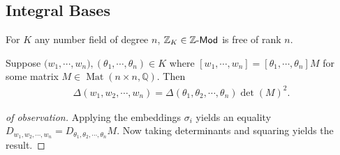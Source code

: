 \hypertarget{integral-bases}{%
\subsection{Integral Bases}\label{integral-bases}}

\begin{theorem}

For \(K\) any number field of degree \(n\),
\({\mathbb{Z}}_K \in {\mathsf{{\mathbb{Z}}}{\hbox{-}}\mathsf{Mod}}\) is
free of rank \(n\).

\end{theorem}

\begin{observation}

Suppose
\(\mathbf{(}w_1, \cdots, w_n), (\theta_1, \cdots, \theta_n) \in K\)
where
\({\left[ {w_1, \cdots, w_n} \right]} = {\left[ { \theta_1, \cdots, \theta_n } \right]} M\)
for some matrix \(M\in \operatorname{Mat}(n\times n, {\mathbb{Q}})\).
Then
\begin{align*}
\Delta({ {w}_1, {w}_2, \cdots, {w}_{n}}) = \Delta({ {\theta}_1, {\theta}_2, \cdots, {\theta}_{n}}) \det(M)^2
.\end{align*}

\end{observation}

\begin{proof}[of observation]

Applying the embeddings \(\sigma_i\) yields an equality
\(D_{ { {w}_1, {w}_2, \cdots, {w}_{n}} }= D_{{ {\theta }_1, {\theta }_2, \cdots, {\theta }_{n}} } M\).
Now taking determinants and squaring yields the result.

\end{proof}

